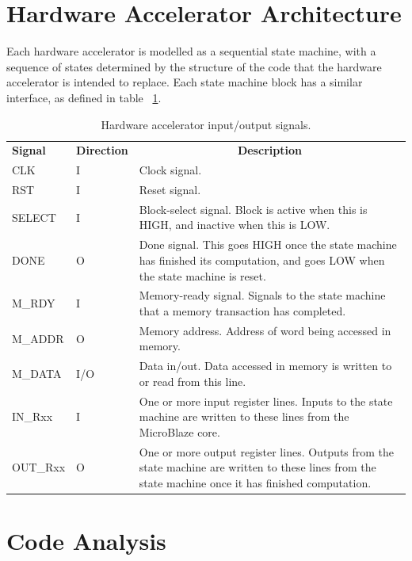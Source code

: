 \documentclass{UoYCSproject}
\begin{document}
\section{Hardware Accelerator Architecture}

Each hardware accelerator is modelled as a sequential state machine, with a sequence of states determined by the structure
of the code that the hardware accelerator is intended to replace. Each state machine block has a similar interface, as defined in table ~\ref{table:acceleratorSignals}.

\begin{table}[h]
\centering
\begin{tabular}{ |p{2cm}|p{2cm}|p{8cm}| }
\textbf{Signal} & \textbf{Direction} & \multicolumn{1}{c}{\textbf{Description}} \\
CLK             & I                  & Clock signal. \\[0.1cm]
RST             & I                  & Reset signal. \\[0.1cm]
SELECT          & I                  & Block-select signal. Block is active when this is HIGH, and inactive when this is LOW. \\[0.1cm]
DONE            & O                  & Done signal. This goes HIGH once the state machine has finished its computation, and goes LOW when the state machine is reset. \\[0.1cm]
M\_RDY          & I                  & Memory-ready signal. Signals to the state machine that a memory transaction has completed. \\[0.1cm]
M\_ADDR         & O                  & Memory address. Address of word being accessed in memory. \\[0.1cm]
M\_DATA         & I/O                & Data in/out. Data accessed in memory is written to or read from this line. \\[0.1cm]
IN\_Rxx         & I                  & One or more input register lines. Inputs to the state machine are written to these lines from the MicroBlaze core. \\[0.1cm]
OUT\_Rxx        & O                  & One or more output register lines. Outputs from the state machine are written to these lines from the state machine once it has finished computation.
\end{tabular}
\caption{Hardware accelerator input/output signals.}
\label{table:acceleratorSignals}
\end{table}

\section{Code Analysis}
\end{document}
